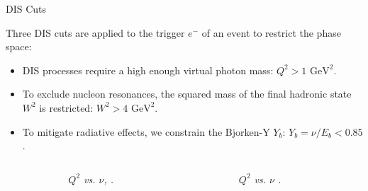\begin{frame}{DIS Cuts}
    \label{11.22::dis_cuts}

    Three DIS cuts are applied to the trigger $e^-$ of an event to restrict the phase space:

    \begin{itemize}
        \item
            DIS processes require a high enough virtual photon mass: \textcolor{efd_green}{$Q^2 > 1 \text{ GeV}^2$}.

        \item
            To exclude nucleon resonances, the squared mass of the final hadronic state $W^2$ is restricted: \textcolor{efd_green}{$W^2 > 4 \text{ GeV}^2$}.

        \item
            To mitigate radiative effects, we constrain the Bjorken-Y $Y_b$: \textcolor{efd_green}{$Y_b = \nu/E_b < 0.85$}.
    \end{itemize}

    \vspace{-18pt}

    \begin{columns}[onlytextwidth,T]

    \begin{column}{.05\linewidth}\end{column} %

    \begin{column}{.44\linewidth}
        \begin{center}
            \begin{figure}[t]
                \scriptsize{\textit{$Q^2$ vs. $\nu$, .}}
            \end{figure}
        \end{center}
    \end{column}

    \begin{column}{.015\linewidth}\end{column} %

    \begin{column}{.44\linewidth}
        \begin{center}
            \begin{figure}[t]
                \scriptsize{\textit{$Q^2$ vs. $\nu$ .}}
            \end{figure}
        \end{center}
    \end{column}

    \begin{column}{.05\linewidth}\end{column} %

    \end{columns}
\end{frame}
